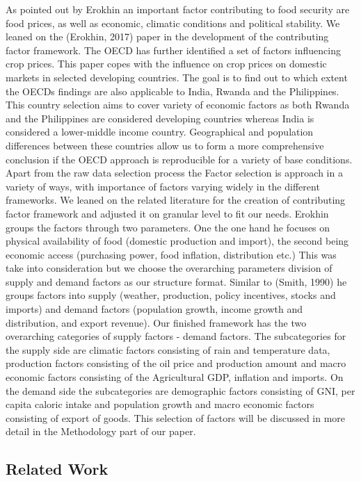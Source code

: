 \documentclass[11pt]{article}
\begin{document}
As pointed out by Erokhin an important factor contributing to food security are food prices, as well as economic, climatic conditions and political stability. We leaned on the (Erokhin, 2017) paper in the development of the contributing factor framework. The OECD has further identified a set of factors influencing crop prices.
This paper copes with the influence on crop prices on domestic markets in selected developing countries. The goal is to find out to which extent the OECDs findings are also applicable to India, Rwanda and the Philippines. This country selection aims to cover variety of economic factors as both Rwanda and the Philippines are considered developing countries whereas India is considered a lower-middle income country. Geographical and population differences between these countries allow us to form a more comprehensive conclusion if the OECD approach is reproducible for a variety of base conditions. 
Apart from the raw data selection process the Factor selection is approach in a variety of ways, with importance of factors varying widely in the different frameworks. We leaned on the related literature for the creation of contributing factor framework and adjusted it on granular level to fit our needs. Erokhin groups the factors through two parameters. One the one hand he focuses on physical availability of food (domestic production and import), the second being economic access (purchasing power, food inflation, distribution etc.) This was take into consideration but we choose the overarching parameters division of supply and demand factors as our structure format. Similar to (Smith, 1990)  he groups factors into supply (weather, production, policy incentives, stocks and imports) and demand factors (population growth, income growth and distribution, and export revenue). 
Our finished framework has the two overarching categories of supply factors - demand factors. The subcategories for the supply side are climatic factors consisting of rain and temperature data, production factors consisting of the oil price and production amount and macro economic factors consisting of the Agricultural GDP, inflation and imports. On the demand side the subcategories are demographic factors consisting of GNI, per capita caloric intake and population growth and macro economic factors consisting of export of goods. This selection of factors will be discussed in more detail in the Methodology part of our paper.


\subsection{Related Work}
\end{document}
